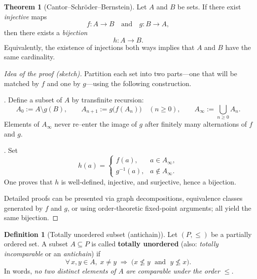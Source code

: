 \documentclass[12pt]{article}
\title{}
\author{Jerich Lee}
\date{\today}
\theoremstyle{definition} %
\newtheorem{theorem}{Theorem}
\newtheorem{definition}{Definition}
\theoremstyle{plain} %
\begin{document}
\maketitle
\begin{theorem}[Cantor–Schröder–Bernstein]
  \label{thm:CSB}
  Let $A$ and $B$ be sets.
  If there exist \emph{injective} maps
  \[
     f : A \longrightarrow B
     \quad\text{and}\quad
     g : B \longrightarrow A,
  \]
  then there exists a \emph{bijection}
  \[
     h : A \longrightarrow B .
  \]
  Equivalently, the existence of injections both ways implies that
  $A$ and $B$ have the same cardinality.
  \end{theorem}
  
  \begin{proof}[Idea of the proof (sketch)]
  Partition each set into two parts—one that will be matched by
  $f$ and one by $g$—using the following construction.
  
  .  Define a subset of $A$ by transfinite recursion:
      \[
         A_0 := A\setminus g(B),
         \qquad
         A_{n+1} := g\!\bigl(f(A_n)\bigr)\quad(n\ge 0),
         \qquad
         A_\infty := \bigcup_{n\ge 0} A_n .
      \]
      Elements of $A_\infty$ never re–enter the image of $g$ after finitely
      many alternations of $f$ and $g$.
  
  .  Set
      \[
          h(a)=
          \begin{cases}
            f(a), & a\in A_\infty,\\[6pt]
            g^{-1}(a), & a\notin A_\infty.
          \end{cases}
      \]
      One proves that $h$ is well‑defined, injective, and surjective,
      hence a bijection.
  
  \smallskip
  Detailed proofs can be presented via graph decompositions,
  equivalence classes generated by $f$ and $g$, or using
  order‑theoretic fixed‑point arguments; all yield the same bijection.
  \end{proof}
  \begin{definition}[Totally unordered subset (antichain)]
    Let $(P,\le)$ be a partially ordered set.
    A subset $A\subseteq P$ is called \textbf{totally unordered}
    (also: \emph{totally incomparable} or an \emph{antichain})
    if
    \[
       \forall\,x,y\in A,\;
       x\neq y
       \;\Longrightarrow\;
       \bigl(x\not\le y \;\text{ and }\; y\not\le x\bigr).
    \]
    In words, \emph{no two distinct elements of $A$ are comparable
    under the order $\le$}.
    \end{definition}
    
\end{document}
